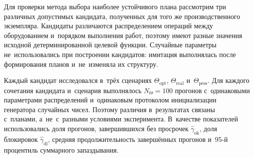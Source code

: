 Для проверки метода выбора наиболее устойчивого плана рассмотрим три различных допустимых кандидата, полученных для того же производственного экземпляра. Кандидаты различаются распределением операций между оборудованием и~порядком выполнения работ, поэтому имеют разные значения исходной детерминированной целевой функции. Случайные параметры не~использовались при построении кандидатов: имитация выполнялась после формирования планов и~не~изменяла их структуру.

Каждый кандидат исследовался в~трёх сценариях $\Theta_{\mathrm{opt}}$, $\Theta_{\mathrm{real}}$ и~$\Theta_{\mathrm{pess}}$. Для каждого сочетания кандидата и~сценария выполнялось $N_{\Theta}=100$ прогонов с~одинаковыми параметрами распределений и~одинаковым протоколом инициализации генератора случайных чисел. Поэтому различия в~результатах связаны с~планами, а~не~с~разными условиями эксперимента. В~качестве показателей использовались доля прогонов, завершившихся без просрочек $\widehat{\gamma}_{\mathrm{ok}}$, доля блокировок $\widehat{\gamma}_{\mathrm{dl}}$, средняя продолжительность завершённых прогонов и~95-й процентиль суммарного запаздывания.

\begin{table}[htbp]
\centering
\small
\caption{Сравнение показателей устойчивости планов-кандидатов}
\label{tab:stability_candidates}
\end{table}

